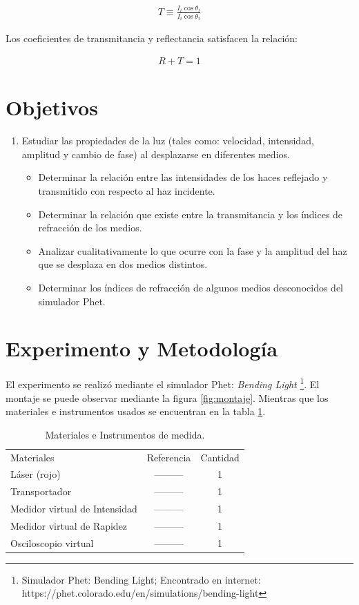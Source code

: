 \documentclass[
aps,
reprint,
amsmath, amssymb,
superscriptaddress,
]{revtex4-2}
\begin{document}
\begin{gather*}
    T \equiv \frac{I_t \cos{\theta_t}}{I_i  \cos{\theta_i}} 
\end{gather*}

Los coeficientes de transmitancia y reflectancia satisfacen la relación:

\begin{gather}
\label{EQN:UNIDAD}
    R + T = 1
\end{gather}
\section{Objetivos}
\begin{enumerate}
    \item Estudiar las propiedades de la luz (tales como: velocidad, intensidad, amplitud y cambio de fase) al desplazarse en diferentes medios.
    \begin{itemize}
        \item Determinar la relación entre las intensidades de los haces reflejado y transmitido con respecto al haz incidente.
        \item Determinar la relación que existe entre la transmitancia y los índices de refracción de los medios.
        \item Analizar cualitativamente lo que ocurre con la fase y la amplitud del haz que se desplaza en dos medios distintos.
        \item Determinar los índices de refracción de algunos medios desconocidos del simulador Phet.
    \end{itemize}
\end{enumerate}

\section{\label{sec:expe}Experimento y Metodología}

El experimento se realizó mediante el simulador Phet: \textit{Bending Light} \footnote{Simulador Phet: Bending Light; Encontrado en internet: https://phet.colorado.edu/en/simulations/bending-light}. El montaje se puede observar mediante la figura \ref{fig:montaje}. Mientras que los materiales e instrumentos usados se encuentran en la tabla \ref{tab:materiales}.
\begin{table}[H]
	\caption{\label{tab:materiales}Materiales e Instrumentos de medida.}
	\begin{ruledtabular}
		\begin{tabular}{lcc}
            \textrm{Materiales} & \textrm{Referencia} & \textrm{Cantidad}\\
			\colrule
            Láser (rojo)                & --------- & 1\\
			Transportador    & --------- & 1\\
            Medidor virtual de Intensidad              & --------- & 1\\
            Medidor virtual de Rapidez   & --------- & 1\\
            Osciloscopio virtual & --------- & 1
	\end{tabular}
	\end{ruledtabular}
\end{table}
\end{document}
